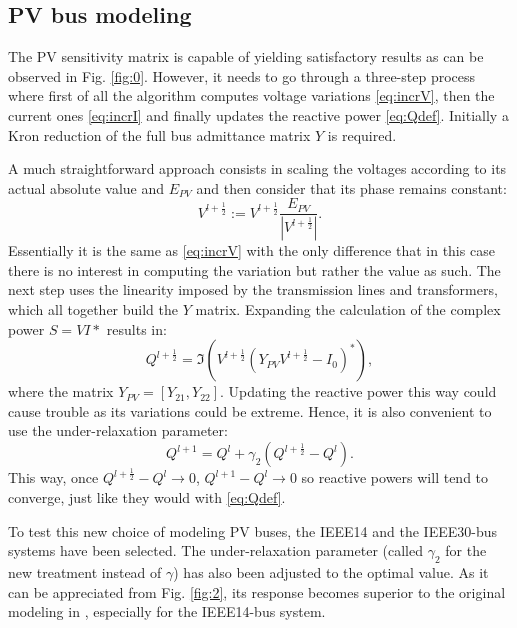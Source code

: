 \documentclass[journal]{IEEEtran}
\begin{document}

\subsection{PV bus modeling}
The PV sensitivity matrix is capable of yielding satisfactory results as can be observed in Fig. \ref{fig:0}. However, it needs to go through a three-step process where first of all the algorithm computes voltage variations \eqref{eq:incrV}, then the current ones \eqref{eq:incrI} and finally updates the reactive power \eqref{eq:Qdef}. Initially a Kron reduction of the full bus admittance matrix $Y$ is required.

A much straightforward approach consists in scaling the voltages according to its actual absolute value and $E_{PV}$ and then consider that its phase remains constant:
\begin{equation}
  V^{l+\frac{1}{2}} := V^{l+\frac{1}{2}} \frac{E_{PV}}{|V^{l+\frac{1}{2}}|}.
  \label{eq:Vnou}
\end{equation}
Essentially it is the same as \eqref{eq:incrV} with the only difference that in this case there is no interest in computing the variation but rather the value as such. The next step uses the linearity imposed by the transmission lines and transformers, which all together build the $Y$ matrix. Expanding the calculation of the complex power $S=VI*$ results in:
\begin{equation}
  Q^{l+\frac{1}{2}}=\Im(V^{l+\frac{1}{2}}(Y_{PV}V^{l+\frac{1}{2}} - I_0)^*),
  \label{eq:Qnou}
\end{equation}
where the matrix $Y_{PV}=[Y_{21}, Y_{22}]$.
Updating the reactive power this way could cause trouble as its variations could be extreme. Hence, it is also convenient to use the under-relaxation parameter:
\begin{equation}
  Q^{l+1}=Q^{l} + \gamma_2 (Q^{l+\frac{1}{2}} - Q^l).
  \label{eq:Qnou2}
\end{equation}
This way, once $Q^{l+\frac{1}{2}} - Q^l\rightarrow 0$, $Q^{l+1} - Q^l\rightarrow 0$ so reactive powers will tend to converge, just like they would with \eqref{eq:Qdef}.

To test this new choice of modeling PV buses, the IEEE14 and the IEEE30-bus systems have been selected. The under-relaxation parameter (called $\gamma_2$ for the new treatment instead of $\gamma$) has also been adjusted to the optimal value. As it can be appreciated from Fig. \ref{fig:2}, its response becomes superior to the original modeling in \cite{asd}, especially for the IEEE14-bus system.  
\end{document}
